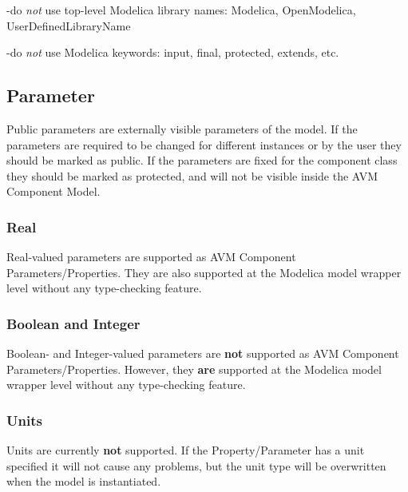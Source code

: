 -do \textit{not} use top-level Modelica library names: Modelica, OpenModelica, UserDefinedLibraryName

-do \textit{not} use Modelica keywords: input, final, protected, extends, etc.


\subsection{Parameter}

Public parameters are externally visible parameters of the model. If the parameters are required to be changed for different instances or by the user they should be marked as public. If the parameters are fixed for the component class they should be marked as protected, and will not be visible inside the AVM Component Model.

\subsubsection{Real}
Real-valued parameters are supported as AVM Component Parameters/Properties. They are also supported at the Modelica model wrapper level without any type-checking feature.

\subsubsection{Boolean and Integer}
Boolean- and Integer-valued parameters are \textbf{not} supported as AVM Component Parameters/Properties. However, they \textbf{are} supported at the Modelica model wrapper level without any type-checking feature.

\subsubsection{Units}
Units are currently \textbf{not} supported. If the Property/Parameter has a unit specified it will not cause any problems, but the unit type will be overwritten when the model is instantiated.

